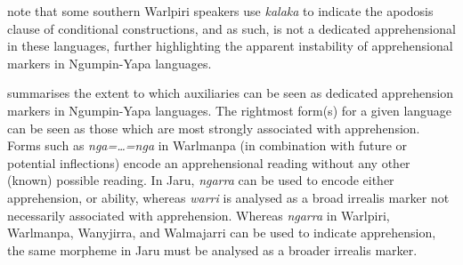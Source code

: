\documentclass[output=paper,colorlinks,citecolor=brown]{langscibook}
\begin{document}
 \citet[231]{laughren_warlpiri-english_2007} note that some southern Warlpiri speakers use \textit{kalaka} to indicate the apodosis clause of conditional constructions, and as such, is not a dedicated apprehensional in these languages, further highlighting the apparent instability of apprehensional markers in Ngumpin-Yapa languages.

 summarises the extent to which auxiliaries can be seen as dedicated apprehension markers in Ngumpin-Yapa languages. The rightmost form(s) for a given language can be seen as those which are most strongly associated with apprehension. Forms such as \textit{nga=\ldots=nga} in Warlmanpa (in combination with future or potential inflections) encode an apprehensional reading without any other (known) possible reading. In Jaru, \textit{ngarra} can be used to encode either apprehension, or ability, whereas \textit{warri} is analysed as a broad irrealis marker not necessarily associated with apprehension. Whereas \textit{ngarra} in Warlpiri, Warlmanpa, Wanyjirra, and Walmajarri can be used to indicate apprehension, the same morpheme in Jaru must be analysed as a broader irrealis marker.
\end{document}
